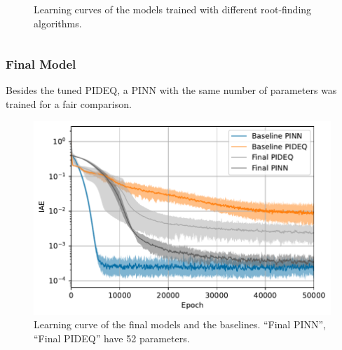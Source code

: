 \documentclass[t]{beamer}
\begin{document}
\begin{frame}
\begin{columns}[c]
\begin{column}{.6\textwidth}
{\begin{figure}[h]
            \caption{Learning curves of the models trained with different root-finding algorithms.}
            \label{fig:solver-iae}
	\end{figure}}
    \end{column}
    \end{columns}
\end{frame}

\begin{frame}
    \frametitle{Final Model}
    Besides the tuned PIDEQ, a PINN with the same number of parameters was trained for a fair comparison.
    \begin{figure}[h]
	\centering
	\includegraphics[width=.6\textwidth]{../images/final_iae.pdf}
	\caption{Learning curve of the final models and the baselines. ``Final PINN'', ``Final PIDEQ'' have 52 parameters.}
	\label{fig:final-iae}
    \end{figure}
\end{frame}
\end{document}
